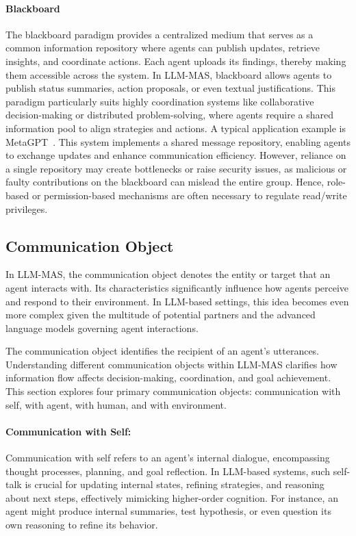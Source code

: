 \paragraph{Blackboard}The blackboard paradigm provides a centralized medium that serves as a common information repository where agents can publish updates, retrieve insights, and coordinate actions. Each agent uploads its findings, thereby making them accessible across the system. In LLM-MAS,  blackboard allows agents to publish status summaries, action proposals, or even textual justifications. This paradigm particularly suits highly coordination systems like collaborative decision-making or distributed problem-solving, where agents require a shared information pool to align strategies and actions. A typical application example is MetaGPT~\cite{metagpt}. This system implements a shared message repository, enabling agents to exchange updates and enhance communication efficiency. However, reliance on a single repository may create bottlenecks or raise security issues, as malicious or faulty contributions on the blackboard can mislead the entire group. Hence, role-based or permission-based mechanisms are often necessary to regulate read/write privileges. 

\subsection{Communication Object}
In LLM-MAS, the communication object denotes the entity or target that an agent interacts with. Its characteristics significantly influence how agents perceive and respond to their environment. In LLM-based settings, this idea becomes even more complex given the multitude of potential partners and the advanced language models governing agent interactions.

The communication object identifies the recipient of an agent's utterances. Understanding different communication objects within LLM-MAS clarifies how information flow affects decision-making, coordination, and goal achievement. This section explores four primary communication objects: communication with self, with agent, with human, and with environment.

\paragraph{Communication with Self:}Communication with self refers to an agent's internal dialogue, encompassing thought processes, planning, and goal reflection. In LLM-based systems, such self-talk is crucial for updating internal states, refining strategies, and reasoning about next steps, effectively mimicking higher-order cognition. For instance, an agent might produce internal summaries, test hypothesis, or even question its own reasoning to refine its behavior.



